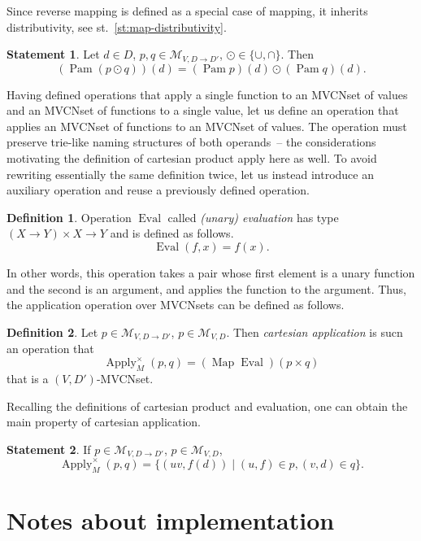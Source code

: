 \documentclass{article}
\theoremstyle{definition}
\newtheorem{Df}{Definition}
\newtheorem{St}{Statement}
\newcommand{\setcharmvcn}{M}
\newcommand{\setsymbol}[3]{\mathcal{#1}_{#2,#3}}
\newcommand{\setmvcn}[2]{\setsymbol{\setcharmvcn}{#1}{#2}}
\newcommand{\fmap}{\operatorname{Map}}
\newcommand{\fpam}{\operatorname{Pam}}
\newcommand{\apply}{\operatorname{Apply}}
\newcommand{\eval}{\operatorname{Eval}}
\begin{document}
Since reverse mapping is defined as a special case of mapping, it inherits
distributivity, see st.~\ref{st:map-distributivity}.

\begin{St}\label{st:pam-distributivity}
Let $d\in D$, $p, q \in \setmvcn{V}{D \to D'}$, $\odot \in \{\cup, \cap \}$. Then
\[
  (\fpam (p \odot q))(d) = (\fpam p)(d) \odot (\fpam q)(d) .
\]
\end{St}

Having defined operations that apply a single function to an MVCNset of values
and an MVCNset of functions to a single value, let us define an
operation that applies an MVCNset of functions to an MVCNset of values. The
operation must preserve trie-like naming structures of both operands~-- the
considerations motivating the definition of cartesian product apply here
as well. To avoid rewriting essentially the same definition twice, let us
instead introduce an auxiliary operation and reuse a previously defined
operation.

\begin{Df}\label{df:eval}
Operation $\eval$ called \emph{(unary) evaluation} has type
$(X \to Y) \times X \to Y$ and is defined as follows.
\[
  \eval (f, x) = f(x) .
\]
\end{Df}

In other words, this operation takes a pair whose first element is a unary
function and the second is an argument, and applies the function to the
argument. Thus, the application operation over MVCNsets can be defined as
follows.

\begin{Df}\label{df:mvcn-apply-cartesian}
Let $p\in \setmvcn{V}{D\to D'}$, $p\in \setmvcn{V}{D}$. Then \emph{cartesian
application} is sucn an operation that
\[
  \apply_{\setcharmvcn}^{\times} (p, q) = (\fmap \eval) (p \times q)
\]
that is a $(V,D')$-MVCNset.
\end{Df}

Recalling the definitions of cartesian product and evaluation, one can
obtain the main property of cartesian application.

\begin{St}\label{st:mvcn-apply-cartesian}
If $p\in \setmvcn{V}{D\to D'}$, $p\in \setmvcn{V}{D}$,
\[
  \apply_{\setcharmvcn}^{\times} (p, q) =
    \{ (uv, f(d)) \mid (u,f) \in p, (v,d) \in q \} .
\]
\end{St}


\section{Notes about implementation}
\end{document}
